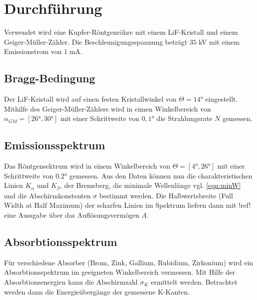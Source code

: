 \newpage
\section{Durchführung}
Verwendet wird eine Kupfer-Röntgenröhre mit einem LiF-Kristall und einem
Geiger-Müller-Zähler. Die Beschleunigungsspannung beträgt $35\;$kV mit
einem Emissionstrom von $1\;$mA.

\subsection{Bragg-Bedingung}
Der LiF-Kristall wird auf einen festen Kristallwinkel von $\Theta=14$° 
eingestellt. Mithilfe des Geiger-Müller-Zählers wird in eimen Winkelbereich
von $\alpha_{GM}=[26°,30°]$ mit einer Schrittweite von $0,1$° die Strahlungsrate $N$
gemessen.

\subsection{Emissionsspektrum}
Das Röntgensektrum wird in einem Winkelbereich von $\Theta=[4°,26°]$
mit einer Schrittweite von $0.2$°  gemessen. 
Aus den Daten können nun die charakteristischen Linien 
$K_{\alpha}$ und $K_{\beta}$, der Bremsberg, die minimale
Wellenlänge vgl. \ref{eqn:minW} und die Abschirmkonstenten $\sigma$ bestimmt werden.
Die Halbwertsbreite (Full Width at Half Maximum) der scharfen Linien 
im Spektrum liefern dann mit !ref! eine Aussgabe über das Auflösungsvermögen $A$.
\subsection{Absorbtionsspektrum}
Für verschiedene Absorber (Brom, Zink, Gallium, Rubidium, Zirkonium)
wird ein Absorbtionsspektrum im geeigneten Winkelbereich vermessen.
Mit Hilfe der Absorbtionsenergien kann die Abschirmzahl $\sigma_K$ 
ermittelt werden.
Betrachtet werden dann die Energieübergänge der gemessene K-Kanten. 





\label{sec:Durchfuehrung}
